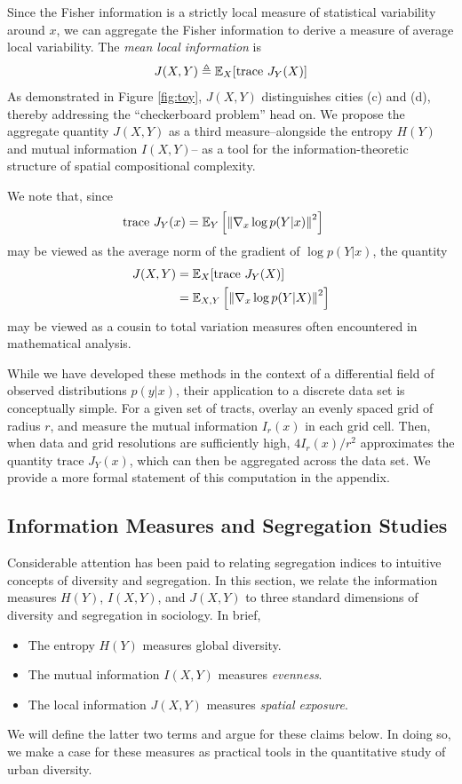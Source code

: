 	Since the Fisher information is a strictly local measure of statistical variability around $x$, we can aggregate the Fisher information to derive a measure of average local variability. The \emph{mean local information} is 
	\begin{equation}
	J(X,Y) \triangleq \mathbb{E}_X[\text{trace }J_Y(X)] \label{eq:def_J}
	\end{equation} 
	As demonstrated in Figure \ref{fig:toy}, $J(X,Y)$ distinguishes cities (c) and (d), thereby addressing the ``checkerboard problem'' head on. We propose the aggregate quantity $J(X,Y)$ as a third  measure--alongside the entropy $H(Y)$ and mutual information $I(X,Y)$-- as a tool for the information-theoretic structure of spatial compositional complexity. 

	We note that, since 
	\begin{align}
		\text{trace } J_Y(x) &= \mathbb{E}_Y\left[ \left\lVert\nabla_x \log p(Y|x)\right\rVert^2 \right]\;
	\end{align}
	may be viewed as the average norm of the gradient of $\log p(Y|x)$, the quantity  
	\begin{align}
		J(X,Y) &= \mathbb{E}_X[\text{trace } J_Y(X)] \\
		&= \mathbb{E}_{X,Y}\left[\left\lVert\nabla_x \log p(Y|X)\right\rVert^2\right]
	\end{align}
	may be viewed as a cousin to total variation measures often encountered in mathematical analysis. 

	While we have developed these methods in the context of a differential field of observed distributions $p(y|x)$, their application to a discrete data set is conceptually simple. For a given set of tracts, overlay an evenly spaced grid of radius $r$, and measure the mutual information $I_r(x)$ in each grid cell. Then, when data and grid resolutions are sufficiently high, $4I_r(x) / r^2$ approximates the quantity $\text{trace }J_Y(x)$, which can then be aggregated across the data set. We provide a more formal statement of this computation in the appendix. 

\subsection*{Information Measures and Segregation Studies}

	Considerable attention has been paid to relating segregation indices to intuitive concepts of diversity and segregation. In this section, we relate the information measures $H(Y)$, $I(X,Y)$, and $J(X,Y)$ to three standard dimensions of diversity and segregation in sociology. In brief,
	\begin{itemize}
		\item The entropy $H(Y)$ measures global diversity. 
		\item The mutual information $I(X,Y)$ measures \emph{evenness}. 
		\item The local information $J(X,Y)$ measures \emph{spatial exposure}. 
	\end{itemize}
	We will define the latter two terms and argue for these claims below. In doing so, we make a case for these measures as practical tools in the quantitative study of urban diversity. 

